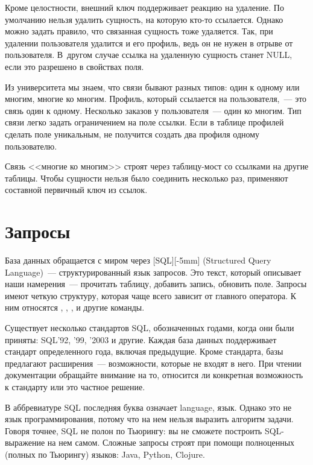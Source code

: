 Кроме целостности, внешний ключ поддерживает реакцию на удаление. По умолчанию нельзя удалить сущность, на которую кто-то ссылается. Однако можно задать правило, что связанная сущность тоже удаляется. Так, при удалении пользователя удалится и его профиль, ведь он не нужен в отрыве от пользователя. В~другом случае ссылка на удаленную сущность станет NULL, если это разрешено в свойствах поля.

Из университета мы знаем, что связи бывают разных типов: один к одному или многим, многие ко многим. Профиль, который ссылается на пользователя,~--- это связь один к одному. Несколько заказов у пользователя~--- один ко многим. Тип связи легко задать ограничением на поле ссылки. Если в таблице профилей сделать поле  уникальным, не получится создать два профиля одному пользователю.

Связь <<многие ко многим>> строят через таблицу-мост со ссылками на другие таблицы. Чтобы сущности нельзя было соединить несколько раз, применяют составной первичный ключ из ссылок.

\section{Запросы}

\def\urlsql{https://en.wikipedia.org/wiki/SQL}


База данных обращается с миром через \footurl{SQL}{\urlsql}[SQL][-5mm] (Structured Query Language)~--- структурированный язык запросов. Это текст, который описывает наши намерения~--- прочитать таблицу, добавить запись, обновить поле. Запросы имеют четкую структуру, которая чаще всего зависит от главного оператора. К ним относятся , , ,  и другие команды.

Существует несколько стандартов SQL, обозначенных годами, когда они были приняты: SQL'92, '99, '2003 и другие. Каждая база данных поддерживает стандарт определенного года, включая предыдущие. Кроме стандарта, базы предлагают расширения~--- возможности, которые не входят в него. При чтении документации обращайте внимание на то, относится ли конкретная возможность к стандарту или это частное решение.

В аббревиатуре SQL последняя буква означает language, язык. Однако это не язык программирования, потому что на нем нельзя выразить алгоритм задачи. Говоря точнее, SQL не полон по Тьюрингу: вы не сможете построить SQL-выражение на нем самом. Сложные запросы строят при помощи полноценных (полных по Тьюрингу) языков: Java, Python, Clojure.

